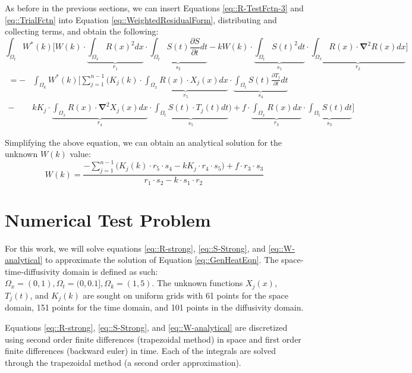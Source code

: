 \documentclass{article}
\def\ds{\displaystyle}
\def\pd{\partial}
\def\grad{\mathbf\nabla}
\begin{document}
As before in the previous sections, we can insert Equations \ref{eq::R-TestFctn-3} and \ref{eq::TrialFctn} into Equation \ref{eq::WeightedResidualForm}, distributing and collecting terms, and obtain the following:
\begin{equation*}
\ds\int_{\Omega_t} W^*(k) \bigg[W(k) \cdot \underbrace{\ds\int_{\Omega_x} R(x)^2 dx}_{r_1} \cdot \underbrace{\ds\int_{\Omega_t} S(t)\frac{\pd S}{\pd t} dt}_{s_2} - kW(k) \cdot \underbrace{\ds\int_{\Omega_t} S(t)^2 dt}_{s_1} \cdot \underbrace{\ds\int_{\Omega_x} R(x)\cdot \grad^2R(x) dx}_{r_2} \bigg]
\end{equation*}\vspace{-15pt}
\begin{align}
=  -& \ds\int_{\Omega_k} W^*(k) \Bigg[\ds\sum_{j=1}^{n-1} \bigg( K_j(k) \cdot \underbrace{\ds\int_{\Omega_x} R(x)\cdot X_j(x) dx}_{r_5} \cdot \underbrace{\ds\int_{\Omega_t} S(t) \frac{\pd T_j}{\pd t} dt}_{s_4} \nonumber\\
- &k K_j  \cdot \underbrace{\ds\int_{\Omega_x} R(x)\cdot \grad^2 X_j(x)dx}_{r_4} \cdot \underbrace{\ds\int_{\Omega_t} S(t)\cdot T_j(t)dt}_{s_5}\bigg) + f\cdot \underbrace{\ds\int_{\Omega_x} R(x) dx }_{r_3} \cdot \underbrace{\ds\int_{\Omega_t}S(t)dt}_{s_3} \Bigg]
\end{align}

Simplifying the above equation, we can obtain an analytical solution for the unknown $W(k)$ value:
\begin{equation}
\label{eq::W-analytical}
W(k) =  \frac{-\ds\sum_{j=1}^{n-1} \bigg( K_j(k) \cdot r_5 \cdot s_4 -  k K_j \cdot r_4 \cdot s_5\bigg) + f\cdot r_3 \cdot s_3}{r_1 \cdot s_2 - k \cdot s_1 \cdot r_2}
\end{equation}

\section{Numerical Test Problem}
For this work, we will solve equations \ref{eq::R-strong}, \ref{eq::S-Strong}, and \ref{eq::W-analytical} to approximate the solution of Equation \ref{eq::GenHeatEqn}. The space-time-diffusivity domain is defined as such: $\Omega_x = (0,1), \Omega_t = (0,0.1], \Omega_k = (1,5)$. The unknown functions $X_j(x)$, $T_j(t)$, and $K_j(k)$ are sought on uniform grids with 61 points for the space domain, 151 points for the time domain, and 101 points in the diffusivity domain.

Equations \ref{eq::R-strong}, \ref{eq::S-Strong}, and \ref{eq::W-analytical} are discretized using second order finite differences (trapezoidal method) in space and first order finite differences  (backward euler) in time. Each of the integrals are solved through the trapezoidal method (a second order approximation).
\end{document}
